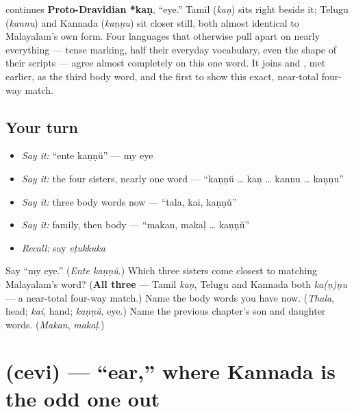 \begin{cousinweb}
\textbf{} continues \textbf{Proto-Dravidian *kaṇ}, \textquotedblleft{}eye.\textquotedblright{} Tamil \textbf{} (\emph{kaṇ}) sits right beside it; Telugu \textbf{} (\emph{kannu}) and Kannada \textbf{} (\emph{kaṇṇu}) sit closer still, both almost identical to Malayalam's own form. Four languages that otherwise pull apart on nearly everything — tense marking, half their everyday vocabulary, even the shape of their scripts — agree almost completely on this one word. It joins \textbf{} and \textbf{}, met earlier, as the third body word, and the first to show this exact, near-total four-way match.
\end{cousinweb}

\subsection*{Your turn}
\begin{itemize}
\raggedright
  \item \emph{Say it:} \textquotedblleft{}ente kaṇṇŭ\textquotedblright{} — my eye
  \item \emph{Say it:} the four sisters, nearly one word — \textquotedblleft{}kaṇṇŭ … kaṇ … kannu … kaṇṇu\textquotedblright{}
  \item \emph{Say it:} three body words now — \textquotedblleft{}tala, kai, kaṇṇŭ\textquotedblright{}
  \item \emph{Say it:} family, then body — \textquotedblleft{}makan, makaḷ … kaṇṇŭ\textquotedblright{}
  \item \emph{Recall:} say \emph{eṭukkuka}
\end{itemize}

\begin{tcolorbox}[breakable,colback=teal!4,colframe=teal!35!black,title={Before you move on}]
Say \textquotedblleft{}my eye.\textquotedblright{} (\emph{Ente kaṇṇŭ}.) Which three sisters come closest to matching Malayalam's word? (\textbf{All three} — Tamil \emph{kaṇ}, Telugu and Kannada both \emph{ka(ṇ)ṇu} — a near-total four-way match.) Name the body words you have now. (\emph{Thala}, head; \emph{kai}, hand; \emph{kaṇṇŭ}, eye.) Name the previous chapter's son and daughter words. (\emph{Makan}, \emph{makaḷ}.)
\end{tcolorbox}
\section[\texorpdfstring{\ml{ചെവി} (cevi)}{ചെവി (cevi)}]{ (cevi) — \textquotedblleft{}ear,\textquotedblright{} where Kannada is the odd one out}

